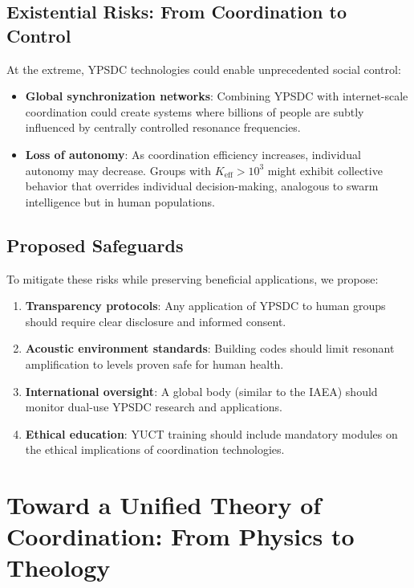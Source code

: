\documentclass[12pt,a4paper]{article}
\begin{document}
	\subsection{Existential Risks: From Coordination to Control}
	
	At the extreme, YPSDC technologies could enable unprecedented social control:
	
	\begin{itemize}
		\item \textbf{Global synchronization networks}: Combining YPSDC with internet-scale coordination could create systems where billions of people are subtly influenced by centrally controlled resonance frequencies.
		
		\item \textbf{Loss of autonomy}: As coordination efficiency increases, individual autonomy may decrease. Groups with $K_{\mathrm{eff}} > 10^3$ might exhibit collective behavior that overrides individual decision-making, analogous to swarm intelligence but in human populations.
	\end{itemize}
	
	\subsection{Proposed Safeguards}
	
	To mitigate these risks while preserving beneficial applications, we propose:
	
	\begin{enumerate}
		\item \textbf{Transparency protocols}: Any application of YPSDC to human groups should require clear disclosure and informed consent.
		
		\item \textbf{Acoustic environment standards}: Building codes should limit resonant amplification to levels proven safe for human health.
		
		\item \textbf{International oversight}: A global body (similar to the IAEA) should monitor dual-use YPSDC research and applications.
		
		\item \textbf{Ethical education}: YUCT training should include mandatory modules on the ethical implications of coordination technologies.
	\end{enumerate}
	
	\section{Toward a Unified Theory of Coordination: From Physics to Theology}
	\label{sec:philosophy}
	
\end{document}
